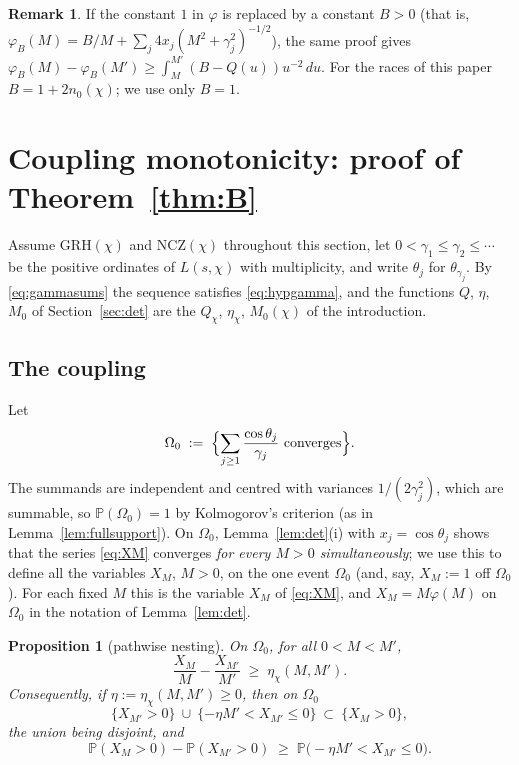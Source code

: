 \documentclass[11pt]{amsart}
\newtheorem{proposition}[theorem]{Proposition}
\theoremstyle{definition}
\newtheorem{remark}[theorem]{Remark}
\numberwithin{equation}{section}
\newcommand{\PP}{\mathbb P}
\begin{document}
\begin{remark}\label{rem:detB}
If the constant $1$ in $\varphi$ is replaced by a constant $B>0$
(that is, $\varphi_B(M)=B/M+\sum_j4x_j(M^2+\gamma_j^2)^{-1/2}$), the
same proof gives
$\varphi_B(M)-\varphi_B(M')\ge\int_M^{M'}(B-Q(u))u^{-2}\,du$. For the
races of this paper $B=1+2n_0(\chi)$; we use only $B=1$.
\end{remark}

\section{Coupling monotonicity: proof of Theorem~\ref{thm:B}}
\label{sec:thmB}

Assume GRH$(\chi)$ and NCZ$(\chi)$ throughout this section, let
$0<\gamma_1\le\gamma_2\le\cdots$ be the positive ordinates of
$L(s,\chi)$ with multiplicity, and write $\theta_j$ for
$\theta_{\gamma_j}$. By \eqref{eq:gammasums} the sequence satisfies
\eqref{eq:hypgamma}, and the functions $Q$, $\eta$, $M_0$ of
Section~\ref{sec:det} are the $Q_\chi$, $\eta_\chi$, $M_0(\chi)$ of
the introduction.

\subsection{The coupling}
Let
\[
\Omega_0\;:=\;\Bigl\{\sum_{j\ge1}\frac{\cos\theta_j}{\gamma_j}
\ \text{converges}\Bigr\}.
\]
The summands are independent and centred with variances
$1/(2\gamma_j^2)$, which are summable, so $\PP(\Omega_0)=1$ by
Kolmogorov's criterion (as in Lemma~\ref{lem:fullsupport}). On
$\Omega_0$, Lemma~\ref{lem:det}(i) with $x_j=\cos\theta_j$ shows that
the series \eqref{eq:XM} converges \emph{for every $M>0$
simultaneously}; we use this to define all the variables $X_M$,
$M>0$, on the one event $\Omega_0$ (and, say, $X_M:=1$ off
$\Omega_0$). For each fixed $M$ this is the variable $X_M$ of
\eqref{eq:XM}, and $X_M=M\varphi(M)$ on $\Omega_0$ in the notation of
Lemma~\ref{lem:det}.

\begin{proposition}[pathwise nesting]\label{prop:nest}
On $\Omega_0$, for all $0<M<M'$,
\begin{equation}\label{eq:pathwise}
\frac{X_M}{M}-\frac{X_{M'}}{M'}\;\ge\;\eta_\chi(M,M') .
\end{equation}
Consequently, if $\eta:=\eta_\chi(M,M')\ge0$, then on $\Omega_0$
\[
\{X_{M'}>0\}\ \cup\ \{-\eta M'<X_{M'}\le0\}\ \subset\ \{X_M>0\},
\]
the union being disjoint, and
\begin{equation}\label{eq:gapB}
\PP(X_M>0)-\PP(X_{M'}>0)\;\ge\;\PP\bigl(-\eta M'<X_{M'}\le0\bigr).
\end{equation}
\end{proposition}
\end{document}
